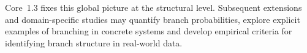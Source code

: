 Core~1.3 fixes this global picture at the structural level. Subsequent
extensions and domain-specific studies may quantify branch
probabilities, explore explicit examples of branching in concrete systems and
develop empirical criteria for identifying branch structure in real-world
data.

